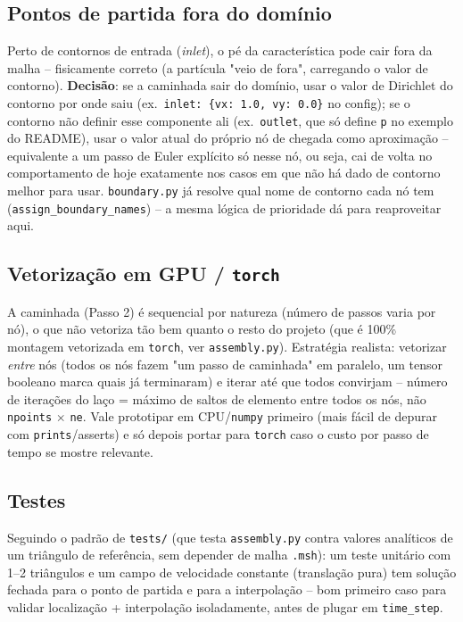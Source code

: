 \documentclass[11pt,a4paper]{article}
\begin{document}
\subsection{Pontos de partida fora do domínio}
\label{sec:fora}

Perto de contornos de entrada (\emph{inlet}), o pé da característica
pode cair fora da malha -- fisicamente correto (a partícula "veio de
fora", carregando o valor de contorno). \textbf{Decisão}: se a
caminhada sair do domínio, usar o valor de Dirichlet do contorno por
onde saiu (ex.\ \texttt{inlet: \{vx: 1.0, vy: 0.0\}} no config); se o
contorno não definir esse componente ali (ex.\ \texttt{outlet}, que
só define \texttt{p} no exemplo do README), usar o valor atual do
próprio nó de chegada como aproximação -- equivalente a um passo de
Euler explícito só nesse nó, ou seja, cai de volta no comportamento
de hoje exatamente nos casos em que não há dado de contorno melhor
para usar. \texttt{boundary.py} já resolve qual nome de contorno cada
nó tem (\texttt{assign\_boundary\_names}) -- a mesma lógica de
prioridade dá para reaproveitar aqui.

\subsection{Vetorização em GPU / \texttt{torch}}

A caminhada (Passo 2) é sequencial por natureza (número de passos
varia por nó), o que não vetoriza tão bem quanto o resto do projeto
(que é 100\% montagem vetorizada em \texttt{torch}, ver
\texttt{assembly.py}). Estratégia realista: vetorizar \emph{entre}
nós (todos os nós fazem "um passo de caminhada" em paralelo, um
tensor booleano marca quais já terminaram) e iterar até que todos
convirjam -- número de iterações do laço = máximo de saltos de
elemento entre todos os nós, não \texttt{npoints} $\times$
\texttt{ne}. Vale prototipar em CPU/\texttt{numpy} primeiro (mais
fácil de depurar com \texttt{prints}/asserts) e só depois portar para
\texttt{torch} caso o custo por passo de tempo se mostre relevante.

\subsection{Testes}

Seguindo o padrão de \texttt{tests/} (que testa \texttt{assembly.py}
contra valores analíticos de um triângulo de referência, sem
depender de malha \texttt{.msh}): um teste unitário com 1--2
triângulos e um campo de velocidade constante (translação pura) tem
solução fechada para o ponto de partida e para a interpolação --
bom primeiro caso para validar localização + interpolação
isoladamente, antes de plugar em \texttt{time\_step}.
\end{document}
